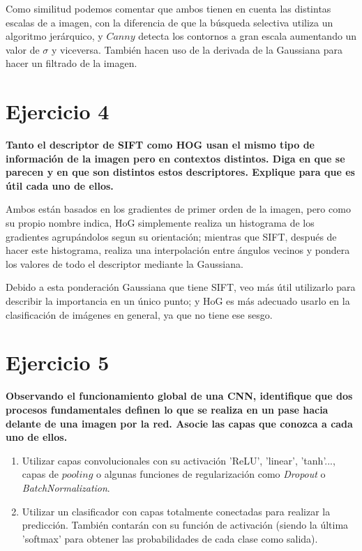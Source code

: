 \documentclass[11pt,a4paper]{article}
\begin{document}
Como similitud podemos comentar que ambos tienen en cuenta las distintas escalas de a imagen, con la diferencia de que la búsqueda selectiva utiliza un algoritmo
jerárquico, y $Canny$ detecta los contornos a gran escala aumentando un valor de $\sigma$ y viceversa. También hacen uso de la derivada de la Gaussiana
para hacer un filtrado de la imagen.


\section*{Ejercicio 4}

\textbf{Tanto el descriptor de SIFT como HOG usan el mismo tipo de información de la imagen pero en contextos distintos. Diga en que se parecen y en que son
distintos estos descriptores. Explique para que es útil cada uno de ellos.}

Ambos están basados en los gradientes de primer orden de la imagen, pero como su propio nombre indica, HoG simplemente realiza un histograma de los gradientes
agrupándolos segun su orientación; mientras que SIFT, después de hacer este histograma, realiza una interpolación entre ángulos vecinos y pondera los valores
de todo el descriptor mediante la Gaussiana.

Debido a esta ponderación Gaussiana que tiene SIFT, veo más útil utilizarlo para describir la importancia en un único punto; y HoG es más adecuado usarlo en
la clasificación de imágenes en general, ya que no tiene ese sesgo.


\section*{Ejercicio 5}

\textbf{Observando el funcionamiento global de una CNN, identifique que dos procesos fundamentales definen lo que se realiza en un pase hacia delante de una
imagen por la red. Asocie las capas que conozca a cada uno de ellos.}

\begin{enumerate}
    \item Utilizar capas convolucionales con su activación 'ReLU', 'linear', 'tanh'..., capas de $pooling$ o algunas funciones de regularización como
          \textit{Dropout} o \textit{BatchNormalization}.
    \item Utilizar un clasificador con capas totalmente conectadas para realizar la predicción. También contarán con su función de activación (siendo la
          última 'softmax' para obtener las probabilidades de cada clase como salida).
\end{enumerate}
\end{document}
